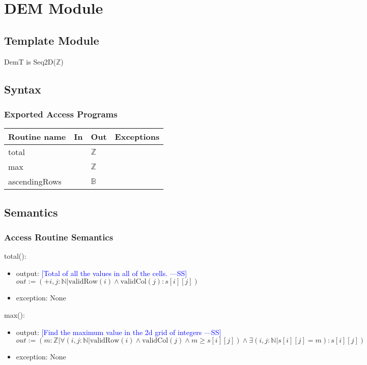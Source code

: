 \documentclass[12pt]{article}
\newcommand{\authornote}[3]{\textcolor{#1}{[#3 ---#2]}}
\newcommand{\authornote}[3]{}
\newcommand{\wss}[1]{\authornote{blue}{SS}{#1}}
\begin{document}
\newpage

\section* {DEM Module}

\subsection* {Template Module}

DemT is Seq2D($\mathbb{Z}$)

\subsection* {Syntax}

\subsubsection* {Exported Access Programs}

\begin{tabular}{| l | l | l | p{6cm} |}
\hline
\textbf{Routine name} & \textbf{In} & \textbf{Out} & \textbf{Exceptions}\\
\hline
total & & $\mathbb{Z}$ & \\
\hline
max &  & $\mathbb{Z}$ & \\
\hline
ascendingRows & & $\mathbb{B}$ & \\
\hline
\end{tabular}

\subsection* {Semantics}

\subsubsection* {Access Routine Semantics}

\noindent total():
\begin{itemize}
\item output: \wss{Total of all the values in all of the cells.}\\
$out := (+ i,j: \mathbb{N}| \text{validRow}(i) \wedge \text{validCol}(j): s[i][j])$
\item exception: None
\end{itemize}

\noindent max():
\begin{itemize}
\item output: \wss{Find the maximum value in the 2d grid of integers}\\
$out := (m: \mathbb{Z} | \forall(i,j: \mathbb{N}| \text{validRow}(i) \wedge \text{validCol}(j) \wedge m \geq s[i][j]) \land \exists(i,j : \mathbb{N}| s[i][j] = m): s[i][j])$\\
\item exception: None
\end{itemize}
\end{document}
